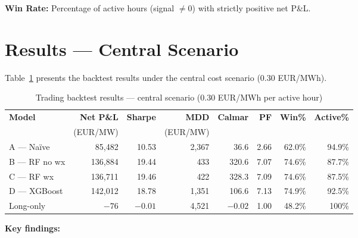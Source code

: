 \textbf{Win Rate:} Percentage of active hours (signal $\neq 0$) with strictly positive net P\&L.

\section{Results — Central Scenario}

Table~\ref{tab:backtest} presents the backtest results under the central cost scenario (0.30 EUR/MWh).

\begin{table}[H]
  \centering
  \small
  \caption{Trading backtest results — central scenario (0.30 EUR/MWh per active hour)}
  \label{tab:backtest}
  \begin{tabular}{lrrrrrrr}
    \toprule
    \textbf{Model} & \textbf{Net P\&L} & \textbf{Sharpe} & \textbf{MDD} & \textbf{Calmar} & \textbf{PF} & \textbf{Win\%} & \textbf{Active\%} \\
    & (EUR/MW) & & (EUR/MW) & & & & \\
    \midrule
    A — Na\"{i}ve    & 85,482  & 10.53  & 2,367  & 36.6   & 2.66 & 62.0\% & 94.9\% \\
    B — RF no wx & 136,884 & 19.44  & 433    & 320.6  & 7.07 & 74.6\% & 87.7\% \\
    C — RF wx    & 136,711 & 19.46  & 422    & 328.3  & 7.09 & 74.6\% & 87.5\% \\
    D — XGBoost  & 142,012 & 18.78  & 1,351  & 106.6  & 7.13 & 74.9\% & 92.5\% \\
    Long-only    & $-76$   & $-0.01$& 4,521  & $-0.02$& 1.00 & 48.2\% & 100\%  \\
    \bottomrule
  \end{tabular}
\end{table}

\textbf{Key findings:}

